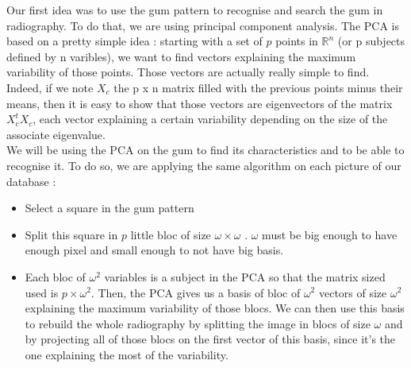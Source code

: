 Our first idea was to use the gum pattern to recognise and search the gum in radiography. To do that, we are using principal component analysis. The PCA is based on a pretty simple idea : starting with a set of $p$ points in $\mathbb{R}^n$ (or p subjects defined by n varibles), we want to find vectors explaining the maximum variability of those points. Those vectors are actually really simple to find. Indeed, if we note $X_{c}$ the p x n matrix filled with the previous points minus their means, then it is easy to show that those vectors are eigenvectors of the matrix $X^{t}_{c}X_{c}$, each vector explaining a certain variability depending on the size of the associate eigenvalue.\\ We will be using the PCA on the gum to find its characteristics and to be able to recognise it. To do so, we are applying the same algorithm on each picture of our database :
\begin{itemize}
\item Select a square in the gum pattern
\item Split this square in $p$ little bloc of size $\omega\times\omega$ . $\omega$ must be big enough to have enough pixel and small enough to not have big basis.
\item Each bloc of $\omega ^2$ variables is a subject in the PCA so that the matrix sized used is $p\times \omega ^2$. Then, the PCA gives us a basis of bloc of $\omega ^2$ vectors of size $\omega ^2$ explaining the maximum variability of those blocs. We can then use this basis to rebuild the whole radiography by splitting the image in blocs of size $\omega$ and by projecting all of those blocs on the first vector of this basis, since it's the one explaining the most of the variability. 
\end{itemize}

